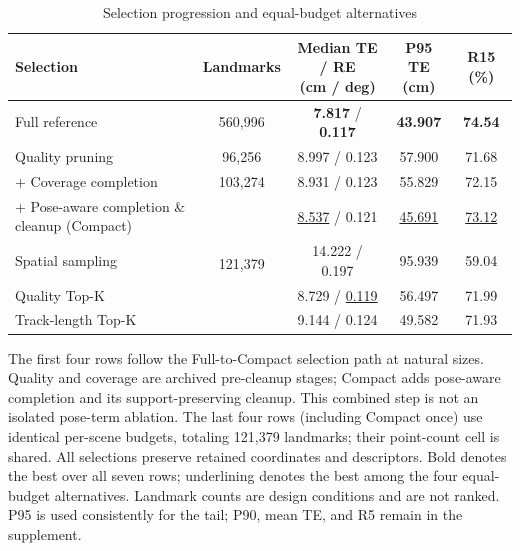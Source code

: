 \begin{table}[tp]
\centering
\footnotesize
\setlength{\tabcolsep}{4pt}
\renewcommand{\arraystretch}{1.12}
\caption{Selection progression and equal-budget alternatives}
\label{tab:t7}
\begin{tabular}{lcccc}
\toprule
Selection & Landmarks & \shortstack{Median TE / RE\\(cm / deg)} & \shortstack{P95 TE\\(cm)} & R15 (\%) \\
\midrule
Full reference & 560,996 & \textbf{7.817} / \textbf{0.117} & \textbf{43.907} & \textbf{74.54} \\
Quality pruning & 96,256 & 8.997 / 0.123 & 57.900 & 71.68 \\
+ Coverage completion & 103,274 & 8.931 / 0.123 & 55.829 & 72.15 \\
+ Pose-aware completion \& cleanup (Compact) & \multirow{4}{*}{121,379} & \underline{8.537} / 0.121 & \underline{45.691} & \underline{73.12} \\
Spatial sampling &  & 14.222 / 0.197 & 95.939 & 59.04 \\
Quality Top-K &  & 8.729 / \underline{0.119} & 56.497 & 71.99 \\
Track-length Top-K &  & 9.144 / 0.124 & 49.582 & 71.93 \\
\bottomrule
\end{tabular}
\par\smallskip\begin{minipage}{0.98\linewidth}\footnotesize The first four rows follow the Full-to-Compact selection path at natural sizes. Quality and coverage are archived pre-cleanup stages; Compact adds pose-aware completion and its support-preserving cleanup. This combined step is not an isolated pose-term ablation. The last four rows (including Compact once) use identical per-scene budgets, totaling 121,379 landmarks; their point-count cell is shared. All selections preserve retained coordinates and descriptors. Bold denotes the best over all seven rows; underlining denotes the best among the four equal-budget alternatives. Landmark counts are design conditions and are not ranked. P95 is used consistently for the tail; P90, mean TE, and R5 remain in the supplement.\end{minipage}
\end{table}

